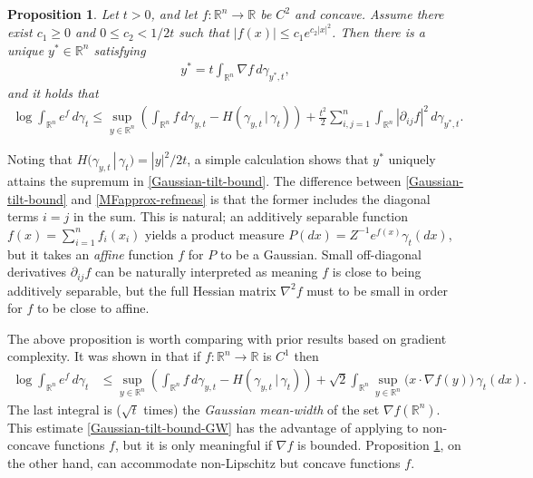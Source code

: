 \documentclass[11pt,reqno]{amsart}
\numberwithin{equation}{section}
\newtheorem{proposition}[theorem]{Proposition}
\theoremstyle{definition}
\def\R{{\mathbb R}}
\begin{document}
\begin{proposition} \label{pr:tilt-Gaussian}
	Let $t > 0$, and let $f : \R^n \to \R$ be $C^2$ and concave. Assume there exist $c_1 \ge 0$ and $0 \le c_2 < 1/2t$ such that $|f(x)| \le c_1e^{c_2|x|^2}$. Then there is a unique $y^* \in \R^n$ satisfying
	\begin{align}
		y^* = t \int_{\R^n} \nabla f \, d\gamma_{y^*,t}, \label{Gaussian-tilt-eq}
	\end{align}
	and it holds that
	\begin{align}
		\log\int_{\R^n} e^f\,d\gamma_t \le \sup_{y \in \R^n}\left( \int_{\R^n} f\,d\gamma_{y,t} - H(\gamma_{y,t}\,|\,\gamma_t)\right) + \frac{t^2}{2}\sum_{i,j=1}^n \int_{\R^n} |\partial_{ij}f|^2\,d\gamma_{y^*,t}. \label{Gaussian-tilt-bound}
	\end{align}
\end{proposition}


Noting that $H(\gamma_{y,t}\,|\,\gamma_t)=|y|^2/2t$, a simple calculation shows that $y^*$ uniquely attains the supremum in \eqref{Gaussian-tilt-bound}.
The difference between \eqref{Gaussian-tilt-bound} and \eqref{MFapprox-refmeas} is that the former includes the diagonal terms $i=j$ in the sum. This is natural; an additively separable function $f(x)=\sum_{i=1}^n f_i(x_i)$ yields a product measure $P(dx)=Z^{-1}e^{f(x)}\gamma_t(dx)$, but it takes an \emph{affine} function $f$ for $P$ to be a Gaussian. Small off-diagonal derivatives $\partial_{ij}f$ can be naturally interpreted as meaning $f$ is close to being additively separable, but the full Hessian matrix $\nabla^2f$ must to be small in order for $f$ to be close to affine.


The above proposition is worth comparing with prior results based on gradient complexity. It was shown in \cite[Proposition 3.4, arXiv version]{augeri2} that if $f : \R^n \to \R$ is $C^1$ then
\begin{align}
	\log\int_{\R^n} e^f\,d\gamma_t &\le  \sup_{y \in \R^n}\left( \int_{\R^n} f\,d\gamma_{y,t} - H(\gamma_{y,t}\,|\,\gamma_t)\right) + \sqrt{2}\int_{\R^n} \sup_{y \in \R^n} \big(x \cdot \nabla f(y)\big) \, \gamma_t(dx). \label{Gaussian-tilt-bound-GW}
\end{align}
The last integral is ($\sqrt{t}$ times) the \emph{Gaussian mean-width} of the set  $\nabla f(\R^n)$. This estimate \eqref{Gaussian-tilt-bound-GW} has the advantage of applying to non-concave functions $f$, but it is only meaningful if $\nabla f$ is bounded. Proposition \ref{pr:tilt-Gaussian}, on the other hand, can accommodate non-Lipschitz but concave functions $f$.
\end{document}
